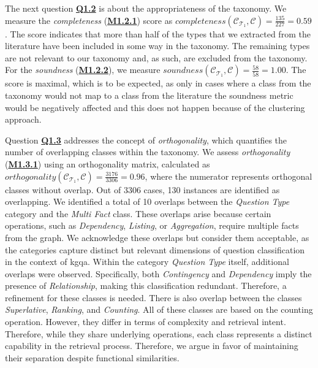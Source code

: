 \begin{sloppypar}
The next question \hyperref[tab:gqm_taxonomy_validation]{\textbf{Q1.2}} is about the appropriateness of the taxonomy. We measure the \emph{completeness} (\hyperref[tab:gqm_taxonomy_validation]{\textbf{M1.2.1}}) score as $completeness(\mathcal{C}_{\mathcal{T}_1}, \mathcal{C}) = \frac{135}{227} = 0.59$. The score indicates that more than half of the types that we extracted from the literature have been included in some way in the taxonomy. The remaining types are not relevant to our taxonomy and, as such, are excluded from the taxonomy. For the \emph{soundness} (\hyperref[tab:gqm_taxonomy_validation]{\textbf{M1.2.2}}), we measure $soundness(\mathcal{C}_{\mathcal{T}_1}, \mathcal{C}) = \frac{58}{58} = 1.00$. The score is maximal, which is to be expected, as only in cases where a class from the taxonomy would not map to a class from the literature the soundness metric would be negatively affected and this does not happen because of the clustering approach.
\end{sloppypar}
\begin{sloppypar}
Question \hyperref[tab:gqm_taxonomy_validation]{\textbf{Q1.3}} addresses the concept of \emph{orthogonality}, which quantifies the number of overlapping classes within the taxonomy. We assess \emph{orthogonality} (\hyperref[tab:gqm_taxonomy_validation]{\textbf{M1.3.1}}) using an orthogonality matrix, calculated as $orthogonality(\mathcal{C}_{\mathcal{T}_1}, \mathcal{C}) = \frac{3176}{3306} = 0.96$, where the numerator represents orthogonal classes without overlap. Out of 3306 cases, 130 instances are identified as overlapping. We identified a total of 10 overlaps between the \emph{Question Type} category and the \emph{Multi Fact} class. These overlaps arise because certain operations, such as \emph{Dependency}, \emph{Listing}, or \emph{Aggregation}, require multiple facts from the graph. We acknowledge these overlaps but consider them acceptable, as the categories capture distinct but relevant dimensions of question classification in the context of \gls{kgqa}. Within the category \emph{Question Type} itself, additional overlaps were observed. Specifically, both \emph{Contingency} and \emph{Dependency} imply the presence of \emph{Relationship}, making this classification redundant. Therefore, a refinement for these classes is needed. There is also overlap between the classes \emph{Superlative}, \emph{Ranking}, and \emph{Counting}. All of these classes are based on the counting operation. However, they differ in terms of complexity and retrieval intent. Therefore, while they share underlying operations, each class represents a distinct capability in the retrieval process. Therefore, we argue in favor of maintaining their separation despite functional similarities.
\end{sloppypar}


